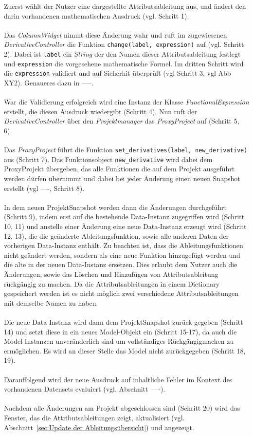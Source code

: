 \documentclass{article}
\begin{document}
Zuerst wählt der Nutzer eine dargestellte Attributsableitung aus, und ändert den darin vorhandenen mathematischen Ausdruck (vgl. Schritt 1). \\\\Das \textit{ColumnWidget} nimmt diese Änderung wahr und ruft im zugewiesenen \textit{DerivativeController} die Funktion \texttt{change(label, expression)} auf (vgl. Schritt 2). Dabei ist \texttt{label} ein \textit{String} der den Namen dieser Attributsableitung festlegt und \texttt{expression} die vorgesehene mathematische Formel. Im dritten Schritt wird die \texttt{expression} validiert und auf Sicherhit überprüft (vgl Schritt 3, vgl Abb XY2). Genaueres dazu in -----. \\\\
War die Validierung erfolgreich wird eine Instanz der Klasse \textit{FunctionalExpression} erstellt, die diesen Ausdruck wiedergibt (Schritt 4). Nun ruft der \textit{DerivativeController} über den \textit{Projektmanager} das \textit{ProxyProject} auf (Schritt 5, 6).\\\\
Das \textit{ProxyProject} führt die Funktion \texttt{set\_derivatives(label, new\_derivative)} aus (Schritt 7). Das Funktionsobject \texttt{new\_derivative} wird dabei dem ProxyProjekt übergeben, das alle Funktionen die auf dem Projekt ausgeführt werden dürfen übernimmt und dabei bei jeder Änderung einen neuen Snapshot erstellt (vgl ----, Schritt 8).\\\\
In dem neuen ProjektSnapshot werden dann die Änderungen durchgeführt (Schritt 9), indem erst auf die bestehende Data-Instanz zugegriffen wird (Schritt 10, 11) und anstelle einer Änderung eine neue Data-Instanz erzeugt wird (Schritt 12, 13), die die geänderte Ableitungsfunktion, sowie alle anderen Daten der vorherigen Data-Instanz enthält. Zu beachten ist, dass die Ableitungsfunktionen nicht geändert werden, sondern als eine neue Funktion hinzugefügt werden und die alte in der neuen Data-Instanz ersetzen. Dies erlaubt dem Nutzer auch die Änderungen, sowie das Löschen und Hinzufügen von Attributsableitung rückgängig zu machen. Da die Attributsableitungen in einem Dictionary gespeichert werden ist es nicht möglich zwei verschiedene Attributsableitungen mit demselbe Namen zu haben.\\\\
Die neue Data-Instanz wird dann dem ProjektSnapshot zurück gegeben (Schritt 14) und setzt diese in ein neues Model-Objekt ein (Schritt 15-17), da auch die Model-Instanzen unveränderlich sind um vollständiges Rückgängigmachen zu ermöglichen. Es wird an dieser Stelle das Model nicht zurückgegeben (Schritt 18, 19).\\\\
Darauffolgend wird der neue Ausdruck auf inhaltliche Fehler im Kontext des vorhandenen Datensets evaluiert (vgl. Abschnitt~----).\\\\
Nachdem alle Änderungen am Projekt abgeschlossen sind (Schritt 20) wird das Fenster, das die Attributsableitungen zeigt, aktualisiert (vgl. Abschnitt~\ref{sec:Update der Ableitungsübersicht}) und angezeigt.
\end{document}
